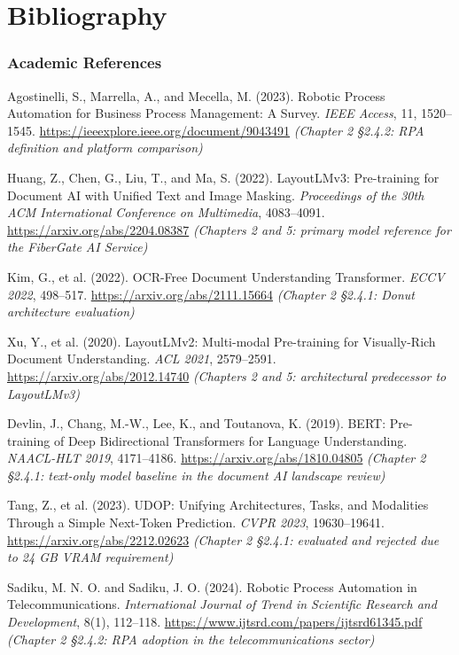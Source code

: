 \chapter*{Bibliography}
\thispagestyle{MyStyle}

\subsection*{Academic References}

Agostinelli, S., Marrella, A., and Mecella, M. (2023). Robotic Process Automation for Business Process Management: A Survey. \textit{IEEE Access}, 11, 1520--1545. \url{https://ieeexplore.ieee.org/document/9043491} \textit{(Chapter 2 \S{}2.4.2: RPA definition and platform comparison)}

Huang, Z., Chen, G., Liu, T., and Ma, S. (2022). LayoutLMv3: Pre-training for Document AI with Unified Text and Image Masking. \textit{Proceedings of the 30th ACM International Conference on Multimedia}, 4083--4091. \url{https://arxiv.org/abs/2204.08387} \textit{(Chapters 2 and 5: primary model reference for the FiberGate AI Service)}

Kim, G., et al. (2022). OCR-Free Document Understanding Transformer. \textit{ECCV 2022}, 498--517. \url{https://arxiv.org/abs/2111.15664} \textit{(Chapter 2 \S{}2.4.1: Donut architecture evaluation)}

Xu, Y., et al. (2020). LayoutLMv2: Multi-modal Pre-training for Visually-Rich Document Understanding. \textit{ACL 2021}, 2579--2591. \url{https://arxiv.org/abs/2012.14740} \textit{(Chapters 2 and 5: architectural predecessor to LayoutLMv3)}

Devlin, J., Chang, M.-W., Lee, K., and Toutanova, K. (2019). BERT: Pre-training of Deep Bidirectional Transformers for Language Understanding. \textit{NAACL-HLT 2019}, 4171--4186. \url{https://arxiv.org/abs/1810.04805} \textit{(Chapter 2 \S{}2.4.1: text-only model baseline in the document AI landscape review)}

Tang, Z., et al. (2023). UDOP: Unifying Architectures, Tasks, and Modalities Through a Simple Next-Token Prediction. \textit{CVPR 2023}, 19630--19641. \url{https://arxiv.org/abs/2212.02623} \textit{(Chapter 2 \S{}2.4.1: evaluated and rejected due to 24 GB VRAM requirement)}

Sadiku, M. N. O. and Sadiku, J. O. (2024). Robotic Process Automation in Telecommunications. \textit{International Journal of Trend in Scientific Research and Development}, 8(1), 112--118. \url{https://www.ijtsrd.com/papers/ijtsrd61345.pdf} \textit{(Chapter 2 \S{}2.4.2: RPA adoption in the telecommunications sector)}

